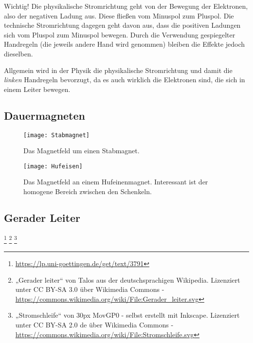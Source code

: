 \begin{leftbar}
	Wichtig! Die physikalische Stromrichtung geht von der Bewegung der Elektronen, also der negativen Ladung aus. Diese fließen vom Minuspol zum Pluspol. Die technische Stromrichtung dagegen geht davon aus, dass die positiven Ladungen sich vom Pluspol zum Minuspol bewegen. Durch die Verwendung gespiegelter Handregeln (die jeweils andere Hand wird genommen) bleiben die Effekte jedoch dieselben. 
	
	Allgemein wird in der Physik die physikalische Stromrichtung und damit die \emph{linken} Handregeln bevorzugt, da es auch wirklich die Elektronen sind, die sich in einem Leiter bewegen.
\end{leftbar}

\subsection{Dauermagneten}  	\label{subsec:DauermagnetFeld}

 \hfill

\begin{figure}[ht!]
	\centering
	\begin{minipage}[b]{0.4\linewidth}
    	\texttt{[image: Stabmagnet]}
		\caption{Das Magnetfeld um einen Stabmagnet.}
	\end{minipage}
	\quad
	\begin{minipage}[b]{0.4\linewidth}
    	\texttt{[image: Hufeisen]}
		\caption{Das Magnetfeld an einem Hufeinenmagnet. Interessant ist der homogene Bereich zwischen den Schenkeln.}
	\end{minipage}
\end{figure}


\subsection{Gerader Leiter} 
\footnote{\url{https://lp.uni-goettingen.de/get/text/3791}} 
\footnote{„Gerader leiter“ von Talos aus der deutschsprachigen Wikipedia. Lizenziert unter CC BY-SA 3.0 über Wikimedia Commons - \url{https://commons.wikimedia.org/wiki/File:Gerader_leiter.svg}} 
\footnote{„Stromschleife“ von 30px MovGP0 - selbst erstellt mit Inkscape. Lizenziert unter CC BY-SA 2.0 de über Wikimedia Commons - \url{https://commons.wikimedia.org/wiki/File:Stromschleife.svg}} 
\label{subsec:GeraderLeiterFeld}

\hfill

